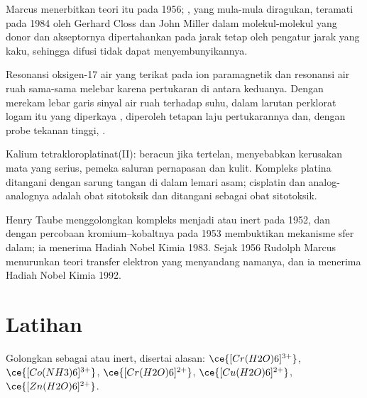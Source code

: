 Marcus menerbitkan teori itu pada 1956; , yang mula-mula diragukan,
teramati pada 1984 oleh Gerhard Closs dan John Miller dalam molekul-molekul yang
donor dan akseptornya dipertahankan pada jarak tetap oleh pengatur jarak yang
kaku, sehingga difusi tidak dapat menyembunyikannya.

\begin{inthelab}
Resonansi oksigen-17 air yang terikat pada ion paramagnetik dan resonansi air
ruah sama-sama melebar karena pertukaran di antara keduanya. Dengan merekam
lebar garis sinyal air ruah terhadap suhu, dalam larutan perklorat logam itu
yang diperkaya , diperoleh tetapan laju pertukarannya dan, dengan probe
tekanan tinggi, .
\end{inthelab}

\begin{safety}{}
Kalium tetrakloroplatinat(II): beracun jika tertelan, menyebabkan kerusakan
mata yang serius, pemeka saluran pernapasan dan kulit. Kompleks platina
ditangani dengan sarung tangan di dalam lemari asam; cisplatin dan
analog-analognya adalah obat sitotoksik dan ditangani sebagai obat sitotoksik.
\end{safety}

\begin{history}
Henry Taube menggolongkan kompleks menjadi  atau inert pada 1952, dan
dengan percobaan kromium--kobaltnya pada 1953 membuktikan mekanisme sfer
dalam; ia menerima Hadiah Nobel Kimia 1983. Sejak 1956 Rudolph Marcus
menurunkan teori transfer elektron yang menyandang namanya, dan ia menerima
Hadiah Nobel Kimia 1992.
\end{history}

\section{Latihan}

\begin{exercise}[$\star$]\label{exo:b3:complex-mechanisms:1}
Golongkan sebagai  atau inert, disertai alasan: $\ce{[Cr(H2O)6]^{3+}}$, $\ce{[Co(NH3)6]^{3+}}$, $\ce{[Cr(H2O)6]^{2+}}$,
$\ce{[Cu(H2O)6]^{2+}}$, $\ce{[Zn(H2O)6]^{2+}}$.
\end{exercise}


